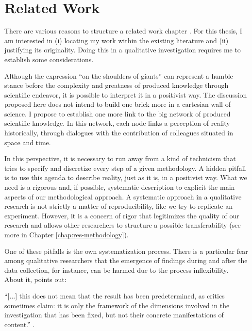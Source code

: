 \chapter{Related Work}
\label{chap:rel-work}

 There are various reasons to structure a related work chapter \cite[p.~14]{booth:2016-slr}. For this thesis, I am interested in (i) locating my work within the existing literature and (ii) justifying its originality. Doing this in a qualitative investigation requires me to establish some considerations.
 
Although the expression “on the shoulders of giants” can represent a humble stance before the complexity and greatness of produced knowledge through scientific endeavor, it is possible to interpret it in a positivist way. The discussion proposed here does not intend to build one brick more in a cartesian wall of science. I propose to establish one more link to the big network of produced scientific knowledge. In this network, each node links a perception of reality historically, through dialogues with the contribution of colleagues situated in space and time.

In this perspective, it is necessary to run away from a kind of technicism that tries to specify and discretize every step of a given methodology. A hidden pitfall is to use this agenda to describe reality, just as it is, in a positivist way. What we need is a rigorous and, if possible, systematic description to explicit the main aspects of our methodological approach. A systematic approach in a qualitative research is not strictly a matter of reproducibility, like we try to replicate an experiment. However, it is a concern of rigor that legitimizes the quality of our research and allows other researchers to structure a possible transferability (see more in Chapter \ref{chap:res-methodology}).

One of these pitfalls is the own systematization process. There is a particular fear among qualitative researchers that the emergence of findings during and after the data collection, for instance, can be harmed due to the process inflexibility. About it,  points out:
\begin{citacao}
    “[...] this does not mean that the result has been predetermined, as critics sometimes claim: it is only the framework of the dimensions involved in the investigation that has been fixed, but not their concrete manifestations of content.” \cite[p.~157]{meinefeld:2004}.
\end{citacao}

